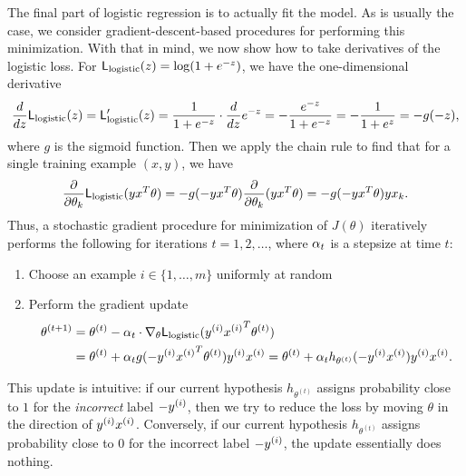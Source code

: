 \documentclass{article}
\begin{document}
The final part of logistic regression is to actually fit the model.
As is usually the case, we consider gradient-descent-based procedures
for performing this minimization. With that in mind, we now show
how to take derivatives of the logistic loss.
For $\mathsf{L}_{\rm logistic}(z) = \log(1 + e^{-z})$,
we have the one-dimensional derivative
\begin{equation*}
  \frac{d}{dz} \mathsf{L}_{\rm logistic}(z)
  = \mathsf{L}_{\rm logistic}'(z)
  = \frac{1}{1 + e^{-z}} \cdot \frac{d}{dz} e^{-z}
  = -\frac{e^{-z}}{1 + e^{-z}}
  = - \frac{1}{1 + e^z} = - g(-z),
\end{equation*}
where $g$ is the sigmoid function. Then we apply the chain rule to find that
for a single training example $(x, y)$, we have
\begin{equation*}
  \frac{\partial}{\partial \theta_k}
  \mathsf{L}_{\rm logistic}(y x^T \theta)
  = -g(-y x^T \theta) \frac{\partial}{\partial \theta_k} (y x^T \theta)
  = -g(-y x^T\theta) y x_k.
\end{equation*}
Thus, a stochastic gradient procedure for minimization of $J(\theta)$
iteratively performs the following for iterations
$t = 1, 2, \ldots$, where $\alpha_t$ is a stepsize at time $t$:
\begin{enumerate}[1.]
\item Choose an example $i \in \{1, \ldots, m\}$ uniformly at random
\item Perform the gradient update
  \begin{align*}
    \theta^{(t + 1)}
    & = \theta^{(t)}
    - \alpha_t \cdot \nabla_\theta \mathsf{L}_{\rm logistic}({y^{(i)}} {x^{(i)}}^T \theta^{(t)}) \\
    & = \theta^{(t)}
    + \alpha_t
    g(-{y^{(i)}} {x^{(i)}}^T \theta^{(t)}) {y^{(i)}} {x^{(i)}}
    = \theta^{(t)}
    + \alpha_t
    h_{\theta^{(t)}} (-{y^{(i)}} {x^{(i)}}) {y^{(i)}} {x^{(i)}}.
  \end{align*}
\end{enumerate}
This update is intuitive: if our current hypothesis
$h_{\theta^{(t)}}$ assigns probability close to $1$ for the
\emph{incorrect} label $-{y^{(i)}}$, then we try to reduce the loss
by moving $\theta$ in the direction of ${y^{(i)}} {x^{(i)}}$. Conversely,
if our current hypothesis $h_{\theta^{(t)}}$ assigns probability
close to $0$ for the incorrect label $-{y^{(i)}}$, the update essentially
does nothing.
\end{document}
